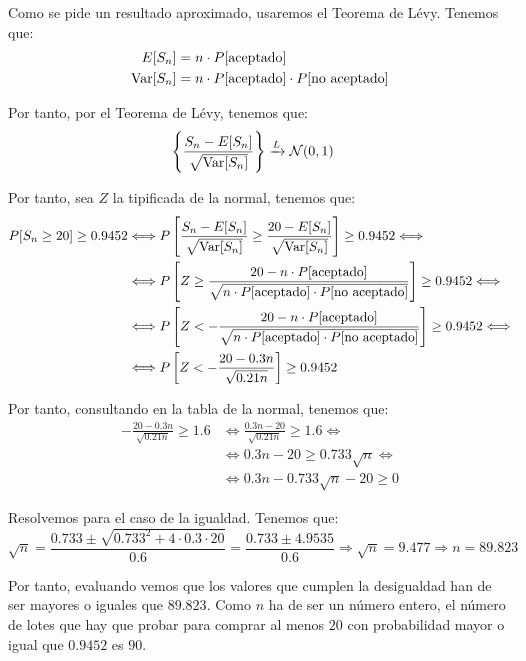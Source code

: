 \begin{ejercicio}
\begin{enumerate}
        Como se pide un resultado aproximado, usaremos el Teorema de Lévy. Tenemos que:
        \begin{align*}
            E[S_{n}] &= n \cdot P[\text{aceptado}]\\
            \operatorname{Var}[S_{n}] &= n \cdot P[\text{aceptado}] \cdot P[\text{no aceptado}]
        \end{align*}

        Por tanto, por el Teorema de Lévy, tenemos que:
        \begin{align*}
            \left\{\frac{S_{n}-E[S_n]}{\sqrt{\operatorname{Var}[S_{n}]}}\right\} &\xrightarrow{L} \mathcal{N}(0,1)
        \end{align*}

        Por tanto, sea $Z$ la tipificada de la normal, tenemos que:
        \begin{align*}
            P[S_{n} \geq 20] \geq 0.9452
            &\Longleftrightarrow P\left[\frac{S_{n}-E[S_n]}{\sqrt{\operatorname{Var}[S_{n}]}} \geq \frac{20 - E[S_n]}{\sqrt{\operatorname{Var}[S_{n}]}}\right] \geq 0.9452
            \Longleftrightarrow \\ & \Longleftrightarrow P\left[Z \geq \frac{20 - n \cdot P[\text{aceptado}]}{\sqrt{n \cdot P[\text{aceptado}] \cdot P[\text{no aceptado}]}}\right] \geq 0.9452
            \Longleftrightarrow \\ & \Longleftrightarrow P\left[Z < -\frac{20 - n \cdot P[\text{aceptado}]}{\sqrt{n \cdot P[\text{aceptado}] \cdot P[\text{no aceptado}]}}\right] \geq 0.9452
            \Longleftrightarrow \\ & \Longleftrightarrow P\left[Z < -\frac{20 - 0.3n}{\sqrt{0.21n}}\right] \geq 0.9452
        \end{align*}

        Por tanto, consultando en la tabla de la normal, tenemos que:
        \begin{align*}
            -\frac{20 - 0.3n}{\sqrt{0.21n}} \geq 1.6
            &\Longleftrightarrow \frac{0.3n-20}{\sqrt{0.21n}} \geq 1.6
            \Longleftrightarrow \\&\Longleftrightarrow 0.3n-20 \geq 0.733\sqrt{n}
            \Longleftrightarrow \\&\Longleftrightarrow 0.3n-0.733\sqrt{n}-20 \geq 0
        \end{align*}

        Resolvemos para el caso de la igualdad. Tenemos que:
        \begin{equation*}
            \sqrt{n} = \frac{0.733\pm \sqrt{0.733^2+4\cdot 0.3\cdot 20}}{0.6}
            = \frac{0.733\pm 4.9535}{0.6}
            \Longrightarrow
            \sqrt{n}=9.477 \Longrightarrow n=89.823
        \end{equation*}

        Por tanto, evaluando vemos que los valores que cumplen la desigualdad han de ser mayores o iguales que $89.823$. Como $n$ ha de ser un número entero, el número de lotes que hay que probar para comprar al menos $20$ con probabilidad mayor o igual que $0.9452$ es $90$.
    \end{enumerate}
    
\end{ejercicio}

